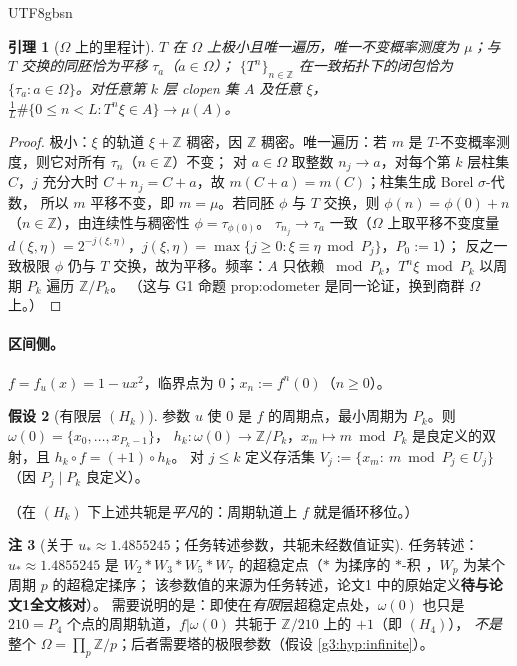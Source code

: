 \documentclass[11pt,a4paper]{article}
\newcommand{\Haar}{\mu}
\newcommand{\status}[1]{\par\noindent\fbox{\textbf{状态：#1}}\par\smallskip}
\newcommand{\Om}{\Omega}               %
\newcommand{\ust}{u_{*}}
\theoremstyle{plain}
\newtheorem{lem}{引理}[section]
\theoremstyle{definition}
\newtheorem{hyp}[lem]{假设}
\newtheorem{rem}[lem]{注}
\begin{document}
\begin{CJK}{UTF8}{gbsn}
\begin{lem}[$\Om$ 上的里程计]\label{g3:lem:odo}
$T$ 在 $\Om$ 上极小且唯一遍历，唯一不变概率测度为 $\Haar$；与 $T$ 交换的同胚恰为平移 $\tau_a$（$a\in\Om$）；
$\{T^n\}_{n\in\mathbb Z}$ 在一致拓扑下的闭包恰为 $\{\tau_a:a\in\Om\}$。对任意第 $k$ 层 clopen 集 $A$ 及任意 $\xi$，
$\frac1L\#\{0\le n<L:T^n\xi\in A\}\to\Haar(A)$。
\end{lem}
\status{已证}
\begin{proof}
极小：$\xi$ 的轨道 $\xi+\mathbb Z$ 稠密，因 $\mathbb Z$ 稠密。唯一遍历：若 $m$ 是 $T$-不变概率测度，则它对所有 $\tau_n$（$n\in\mathbb Z$）不变；
对 $a\in\Om$ 取整数 $n_j\to a$，对每个第 $k$ 层柱集 $C$，$j$ 充分大时 $C+n_j=C+a$，故 $m(C+a)=m(C)$；柱集生成 Borel $\sigma$-代数，
所以 $m$ 平移不变，即 $m=\Haar$。若同胚 $\phi$ 与 $T$ 交换，则 $\phi(n)=\phi(0)+n$（$n\in\mathbb Z$），由连续性与稠密性 $\phi=\tau_{\phi(0)}$。
$\tau_{n_j}\to\tau_a$ 一致（$\Om$ 上取平移不变度量 $d(\xi,\eta)=2^{-j(\xi,\eta)}$，$j(\xi,\eta)=\max\{j\ge0:\xi\equiv\eta\bmod P_j\}$，$P_0:=1$）；
反之一致极限 $\phi$ 仍与 $T$ 交换，故为平移。频率：$A$ 只依赖 $\bmod P_k$，$T^n\xi\bmod P_k$ 以周期 $P_k$ 遍历 $\mathbb Z/P_k$。
（这与 G1 命题 prop:odometer \cite{G1} 是同一论证，换到商群 $\Om$ 上。）
\end{proof}

\paragraph{区间侧。}
$f=f_u(x)=1-ux^2$，临界点为 $0$；$x_n:=f^n(0)$（$n\ge0$）。

\begin{hyp}[有限层 $(H_k)$]\label{g3:hyp:finite}
参数 $u$ 使 $0$ 是 $f$ 的周期点，最小周期为 $P_k$。则 $\omega(0)=\{x_0,\dots,x_{P_k-1}\}$，
$h_k:\omega(0)\to\mathbb Z/P_k$，$x_m\mapsto m\bmod P_k$ 是良定义的双射，且 $h_k\circ f=(+1)\circ h_k$。
对 $j\le k$ 定义存活集 $V_j:=\{x_m:\ m\bmod P_j\in U_j\}$（因 $P_j\mid P_k$ 良定义）。
\end{hyp}
（在 $(H_k)$ 下上述共轭是\emph{平凡}的：周期轨道上 $f$ 就是循环移位。）

\begin{rem}[关于 $\ust\approx1.4855245$；任务转述参数，共轭未经数值证实]\label{g3:rem:ustar}
任务转述：$\ust\approx1.4855245$ 是 $W_2*W_3*W_5*W_7$ 的超稳定点（$*$ 为揉序的 $*$-积 \cite{MSS73}，$W_p$ 为某个周期 $p$ 的超稳定揉序；
该参数值的来源为任务转述，论文1 中的原始定义\textbf{待与论文1全文核对}）。
需要说明的是：即使在\emph{有限}层超稳定点处，$\omega(0)$ 也只是 $210=P_4$ 个点的周期轨道，$f|\omega(0)$ 共轭于 $\mathbb Z/210$ 上的 $+1$（即 $(H_4)$），
\emph{不是}整个 $\Om=\prod_p\mathbb Z/p$；后者需要塔的极限参数（假设 \ref{g3:hyp:infinite}）。


\end{rem}
\end{CJK}
\end{document}
